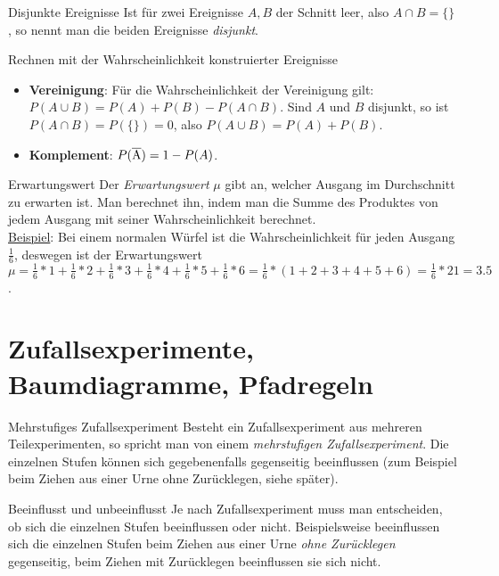 \begin{bla}{Disjunkte Ereignisse}
  Ist für zwei Ereignisse $A, B$ der Schnitt leer, also $A\cap B=\{ \}$,
  so nennt man die beiden Ereignisse \emph{disjunkt}.
\end{bla}

\begin{bla}{Rechnen mit der Wahrscheinlichkeit konstruierter Ereignisse}%
  \begin{itemize}
    \item \textbf{Vereinigung}: Für die Wahrscheinlichkeit der Vereinigung gilt: $P(A\cup B)=P(A)+P(B)-P(A\cap B)$.
    Sind $A$ und $B$ disjunkt, so ist $P(A\cap B)=P(\{ \})=0$, also $P(A\cup B)=P(A)+P(B)$.
    \item \textbf{Komplement}: $P(\overline{\rm{A}})=1-P(A)$.
  \end{itemize}
\end{bla}

\begin{bla}{Erwartungswert}
  Der \emph{Erwartungswert} $\mu$ gibt an, welcher Ausgang im Durchschnitt zu erwarten ist. Man berechnet ihn, indem man die Summe des Produktes von jedem Ausgang mit seiner Wahrscheinlichkeit berechnet.
  \\
  \underline{Beispiel}: Bei einem normalen Würfel ist die Wahrscheinlichkeit für jeden Ausgang $\tfrac{1}{6}$, deswegen ist der Erwartungswert $\mu=\tfrac{1}{6}*1+\tfrac{1}{6}*2+\tfrac{1}{6}*3+\tfrac{1}{6}*4+\tfrac{1}{6}*5+\tfrac{1}{6}*6=\tfrac{1}{6}*(1+2+3+4+5+6)=\tfrac{1}{6}*21=3.5$.
\end{bla}

\clearpage
\section{Zufallsexperimente, Baumdiagramme, Pfadregeln}

\begin{bla}{Mehrstufiges Zufallsexperiment}
  Besteht ein Zufallsexperiment aus mehreren Teilexperimenten, so spricht man von einem
  \emph{mehrstufigen Zufallsexperiment}. Die einzelnen Stufen können sich gegebenenfalls
  gegenseitig beeinflussen (zum Beispiel beim Ziehen aus einer Urne ohne Zurücklegen,
  siehe später).
\end{bla}

\begin{bla}{Beeinflusst und unbeeinflusst}
  Je nach Zufallsexperiment muss man entscheiden, ob sich die einzelnen Stufen beeinflussen oder nicht. Beispielsweise beeinflussen sich die einzelnen Stufen beim Ziehen aus einer Urne \emph{ohne Zurücklegen} gegenseitig, beim Ziehen mit Zurücklegen beeinflussen sie sich nicht.
\end{bla}



